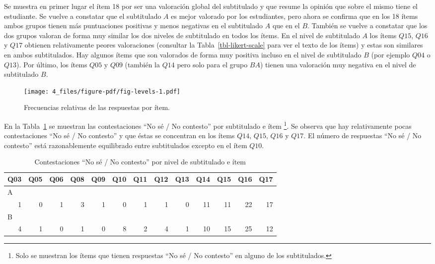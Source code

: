 \documentclass[
  12pt,
  a4paper,
  extrafontsizes,
  onecolumn,
  openright,
  table]{memoir}
\begin{document}
Se muestra en primer lugar el ítem 18 por ser una valoración global del
subtitulado y que resume la opinión que sobre el mismo tiene el
estudiante. Se vuelve a constatar que el subtitulado \(A\) es mejor
valorado por los estudiantes, pero ahora se confirma que en los 18 ítems
ambos grupos tienen más puntuaciones positivas y menos negativas en el
subtitulado \(A\) que en el \(B\). También se vuelve a constatar que los
dos grupos valoran de forma muy similar los dos niveles de subtitulado
en todos los ítems. En el nivel de subtitulado \(A\) los ítems \(Q15\),
\(Q16\) y \(Q17\) obtienen relativamente peores valoraciones (consultar
la Tabla~\ref{tbl-likert-scale} para ver el texto de los ítems) y estas
son similares en ambos subtitulados. Hay algunos ítems que son valorados
de forma muy positiva incluso en el nivel de subtitulado \(B\) (por
ejemplo \(Q04\) o \(Q13\)). Por último, los ítems \(Q05\) y \(Q09\)
(también la \(Q14\) pero solo para el grupo \(BA\)) tienen una
valoración muy negativa en el nivel de subtitulado \(B\).

\begin{figure}[h]

{\centering \texttt{[image: 4\_files/figure-pdf/fig-levels-1.pdf]}

}

\caption{\label{fig-levels}Frecuencias relativas de las respuestas por
ítem.}

\end{figure}

En la Tabla~\ref{tbl-no-response} se muestran las contestaciones
\enquote{No sé / No contesto} por subtitulado e ítem \footnote{Solo se
  muestran los ítems que tienen respuestas \enquote{No sé / No contesto}
  en alguno de los subtitulados.}. Se observa que hay relativamente
pocas contestaciones \enquote{No sé / No contesto} y que éstas se
concentran en los ítems \(Q14\), \(Q15\), \(Q16\) y \(Q17\). El número
de respuestas \enquote{No sé / No contesto} está razonablemente
equilibrado entre subtitulados excepto en el ítem \(Q10\).

\small

\hypertarget{tbl-no-response}{}
\begin{longtable}{rrrrrrrrrrrrr}
\caption{\label{tbl-no-response}Contestaciones ``No sé / No contesto'' por nivel de subtitulado e ítem }\tabularnewline

\toprule
Q03 & Q05 & Q06 & Q08 & Q09 & Q10 & Q11 & Q12 & Q13 & Q14 & Q15 & Q16 & Q17 \\ 
\midrule
\multicolumn{13}{l}{A} \\ 
\midrule
1 & 0 & 1 & 3 & 1 & 0 & 1 & 1 & 0 & 11 & 11 & 22 & 17 \\ 
\midrule
\multicolumn{13}{l}{B} \\ 
4 & 1 & 0 & 1 & 0 & 8 & 2 & 4 & 1 & 10 & 15 & 25 & 12 \\ 
\bottomrule
\end{longtable}
\end{document}
